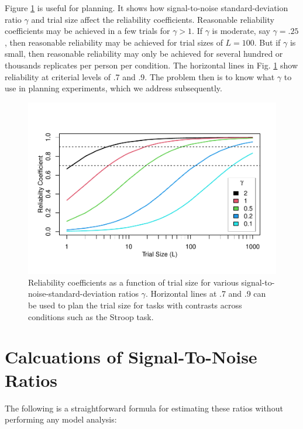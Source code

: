 \documentclass[
  ,man]{apa6}
\begin{document}
Figure \ref{fig:rel} is useful for planning. It shows how signal-to-noise standard-deviation ratio \(\gamma\) and trial size affect the reliability coefficients. Reasonable reliability coefficients may be achieved in a few trials for \(\gamma>1\). If \(\gamma\) is moderate, say \(\gamma=.25\), then reasonable reliability may be achieved for trial sizes of \(L=100\). But if \(\gamma\) is small, then reasonable reliability may only be achieved for several hundred or thousands replicates per person per condition. The horizontal lines in Fig. \ref{fig:rel} show reliability at criterial levels of .7 and .9. The problem then is to know what \(\gamma\) to use in planning experiments, which we address subsequently.

\begin{figure}
\centering
\includegraphics{p_files/figure-latex/rel-1.pdf}
\caption{\label{fig:rel}Reliability coefficients as a function of trial size for various signal-to-noise-standard-deviation ratios \(\gamma\). Horizontal lines at .7 and .9 can be used to plan the trial size for tasks with contrasts across conditions such as the Stroop task.}
\end{figure}

\hypertarget{calcuations-of-signal-to-noise-ratios}{%
\section{Calcuations of Signal-To-Noise Ratios}\label{calcuations-of-signal-to-noise-ratios}}

The following is a straightforward formula for estimating these ratios without performing any model analysis:
\end{document}

